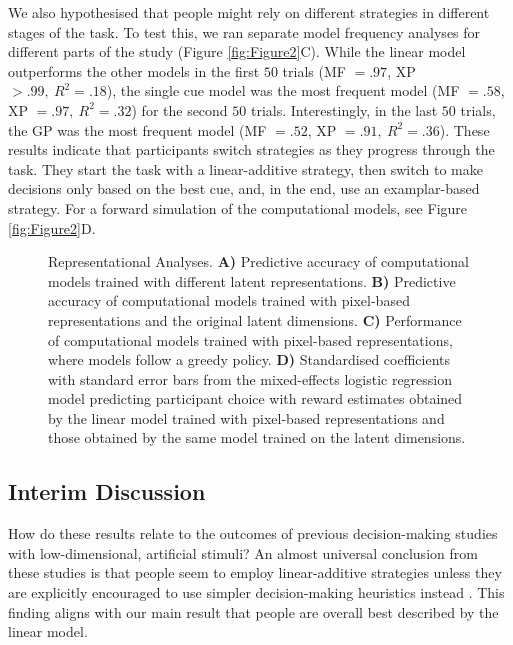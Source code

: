 \documentclass[10pt]{article}
\begin{document}
We also hypothesised that people might rely on different strategies in different stages of the task. To test this, we ran separate model frequency analyses for different parts of the study (Figure \ref{fig:Figure2}C). While the linear model outperforms the other models in the first $50$ trials (MF $= .97$, XP$>.99, \: R^2 = .18$), the single cue model was the most frequent model (MF $= .58$, XP $=.97, \: R^2=.32$) for the second $50$ trials. Interestingly, in the last $50$ trials, the GP was the most frequent model (MF $= .52$, XP $=.91, \: R^2=.36$). These results indicate that participants switch strategies as they progress through the task. They start the task with a linear-additive strategy, then switch to make decisions only based on the best cue, and, in the end, use an examplar-based strategy. For a forward simulation of the computational models, see Figure \ref{fig:Figure2}D.

\begin{figure*}[t]
\centering
\resizebox{\textwidth}{!}{}
\caption{Representational Analyses. \textbf{A)} Predictive accuracy of computational models trained with different latent representations. \textbf{B)} Predictive accuracy of computational models trained with pixel-based representations and the original latent dimensions. \textbf{C)} Performance of computational models trained with pixel-based representations, where models follow a greedy policy. \textbf{D)} Standardised coefficients with standard error bars from the mixed-effects logistic regression model predicting participant choice with reward estimates obtained by the linear model trained with pixel-based representations and those obtained by the same model trained on the latent dimensions. \vspace{-0.5cm}}
\label{fig:Figure3}
\end{figure*}

\subsection{Interim Discussion}

How do these results relate to the outcomes of previous decision-making studies with low-dimensional, artificial stimuli? An almost universal conclusion from these studies is that people seem to employ linear-additive strategies unless they are explicitly encouraged to use simpler decision-making heuristics instead \citep{binz_heuristics_2022}. This finding aligns with our main result that people are overall best described by the linear model.
\end{document}
